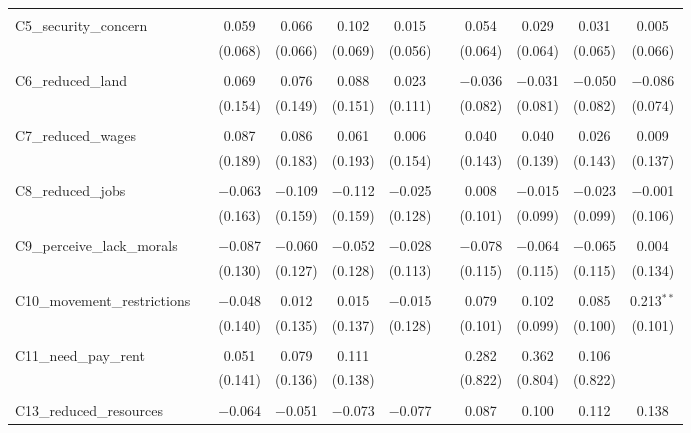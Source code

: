 \begin{table}[H]
\begin{tabular}{@{\extracolsep{4pt}}lcccccccccc}
  & & & & & & & & & & \\ 
 C5\_security\_concern &  & 0.059 & 0.066 & 0.102 & 0.015 &  & 0.054 & 0.029 & 0.031 & 0.005 \\ 
  &  & (0.068) & (0.066) & (0.069) & (0.056) &  & (0.064) & (0.064) & (0.065) & (0.066) \\ 
  & & & & & & & & & & \\ 
 C6\_reduced\_land &  & 0.069 & 0.076 & 0.088 & 0.023 &  & $-$0.036 & $-$0.031 & $-$0.050 & $-$0.086 \\ 
  &  & (0.154) & (0.149) & (0.151) & (0.111) &  & (0.082) & (0.081) & (0.082) & (0.074) \\ 
  & & & & & & & & & & \\ 
 C7\_reduced\_wages &  & 0.087 & 0.086 & 0.061 & 0.006 &  & 0.040 & 0.040 & 0.026 & 0.009 \\ 
  &  & (0.189) & (0.183) & (0.193) & (0.154) &  & (0.143) & (0.139) & (0.143) & (0.137) \\ 
  & & & & & & & & & & \\ 
 C8\_reduced\_jobs &  & $-$0.063 & $-$0.109 & $-$0.112 & $-$0.025 &  & 0.008 & $-$0.015 & $-$0.023 & $-$0.001 \\ 
  &  & (0.163) & (0.159) & (0.159) & (0.128) &  & (0.101) & (0.099) & (0.099) & (0.106) \\ 
  & & & & & & & & & & \\ 
 C9\_perceive\_lack\_morals &  & $-$0.087 & $-$0.060 & $-$0.052 & $-$0.028 &  & $-$0.078 & $-$0.064 & $-$0.065 & 0.004 \\ 
  &  & (0.130) & (0.127) & (0.128) & (0.113) &  & (0.115) & (0.115) & (0.115) & (0.134) \\ 
  & & & & & & & & & & \\ 
 C10\_movement\_restrictions &  & $-$0.048 & 0.012 & 0.015 & $-$0.015 &  & 0.079 & 0.102 & 0.085 & 0.213$^{**}$ \\ 
  &  & (0.140) & (0.135) & (0.137) & (0.128) &  & (0.101) & (0.099) & (0.100) & (0.101) \\ 
  & & & & & & & & & & \\ 
 C11\_need\_pay\_rent &  & 0.051 & 0.079 & 0.111 &  &  & 0.282 & 0.362 & 0.106 &  \\ 
  &  & (0.141) & (0.136) & (0.138) &  &  & (0.822) & (0.804) & (0.822) &  \\ 
  & & & & & & & & & & \\ 
 C13\_reduced\_resources &  & $-$0.064 & $-$0.051 & $-$0.073 & $-$0.077 &  & 0.087 & 0.100 & 0.112 & 0.138 \\ 

\end{tabular}
\end{table}
